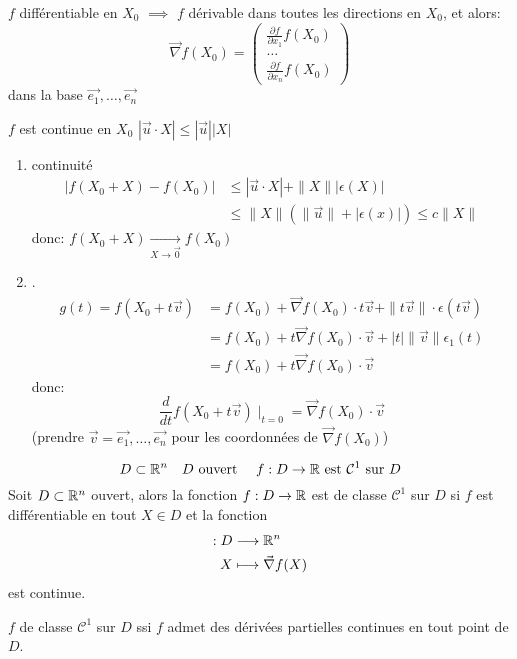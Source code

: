 \begin{prop}
   $f$ différentiable en  $X_0$ $\implies$ $f$ dérivable dans toutes les directions en  $X_0$, et alors: 
   \[
       \vec{\nabla}f(X_0) = \begin{pmatrix} \frac{\partial f}{\partial x_1}f(X_0)\\ \ldots \\  \frac{\partial f}{\partial x_n}f(X_0)\end{pmatrix} 
   \] 
   dans la base $\vec{e_1}, \ldots, \vec{e_n}$
\end{prop}

\begin{preuve}
$f$ est continue en  $X_0$ $|\vec{u} \cdot X| \le |\vec{u}| |X|$
\begin{enumerate}
    \item continuité
        \begin{align*}
            |f(X_0 + X) - f(X_0)| &\le |\vec{u} \cdot X| + \|X\| |\epsilon(X)|\\
                                  &\le \|X\|\left( \|\vec{u}\| + |\epsilon(x)|  \right) \le c\|X\|
        \end{align*}
        donc: $f(X_0 + X) \xrightarrow[X \to \vec{0}]{} f(X_0)$
    \item .
        \begin{align*}
            g(t) = f(X_0 + t \vec{v}) &= f(X_0) + \vec{\nabla}f(X_0) \cdot t \vec{v} + \|t \vec{v}\| \cdot \epsilon(t \vec{v})\\
                                      &= f(X_0) + t\vec{\nabla}f(X_0) \cdot \vec{v} + |t|\|\vec{v}\|\epsilon_1(t)\\
                                      &= f(X_0) + t\vec{\nabla }f(X_0)\cdot \vec{v}
        \end{align*}
        donc:
        \[
            \frac{d}{dt} f(X_0 + t\vec{v})\mid_{t = 0} = \vec{\nabla}f(X_0)\cdot \vec{v}
        \] 
        (prendre $\vec{v} = \vec{e_1}, \ldots, \vec{e_n}$ pour les coordonnées de $\vec{\nabla}f(X_0)$)
\end{enumerate}
\end{preuve}
\begin{definition}
    \[
        D \subset \mathbb{R}^n \quad D \text{ ouvert } \quad f: D \to \mathbb{R} \text{ est } \mathcal{C}^1 \text{ sur } D
    \] 
    Soit $D \subset \mathbb{R}^n$ ouvert, alors la fonction $f: D \to \mathbb{R}$ est de classe $\mathcal{C}^1$ sur  $D$ si 
    $f$ est différentiable en tout  $X \in D$ et la fonction
    \begin{align*}
        : D &\longrightarrow \mathbb{R}^n \\
        X &\longmapsto \vec{\nabla}f(X)
    \end{align*}
    est continue.
\end{definition}
\begin{theorem}
    $f$ de classe  $\mathcal{C}^1$ sur  $D$ ssi  $f$ admet des dérivées partielles continues en tout point de  $D$. 
\end{theorem}

